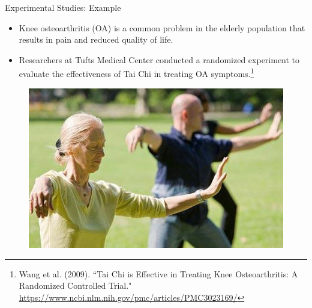 \documentclass[10pt]{beamer}
\begin{document}
\begin{frame}{Experimental Studies: Example}
\begin{itemize}
\item Knee osteoarthritis (OA) is a common problem in the elderly population that results in pain and reduced quality of life.  
\vspace{5pt}
\item Researchers at Tufts Medical Center conducted a randomized experiment to evaluate the effectiveness of Tai Chi in treating OA symptoms.\footnote{\scriptsize Wang et al. (2009). ``Tai Chi is Effective in Treating Knee Osteoarthritis: A Randomized Controlled Trial." \url{https://www.ncbi.nlm.nih.gov/pmc/articles/PMC3023169/}}
\end{itemize}
\begin{figure}
\flushright
\includegraphics[scale=0.3]{figure/taiChi.jpg}
\end{figure}
\end{frame}
\end{document}
